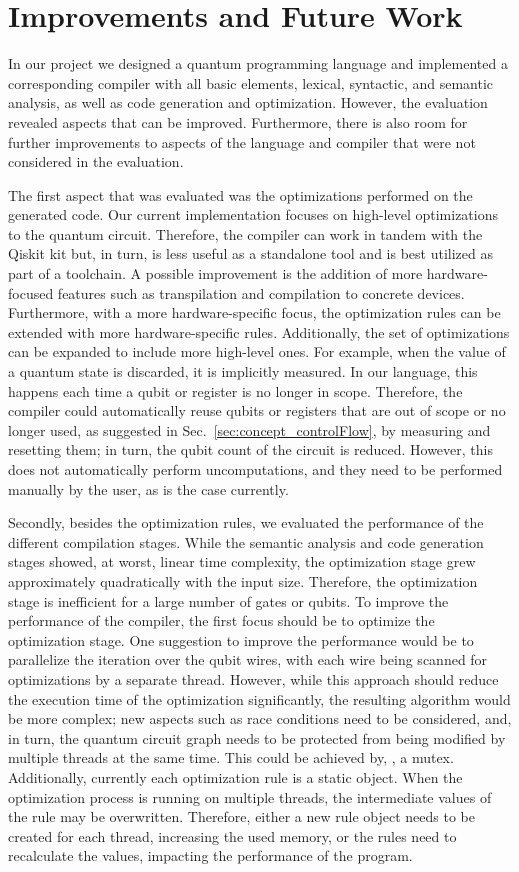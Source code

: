 \section{Improvements and Future Work}
In our project we designed a quantum programming language and implemented a corresponding compiler with all basic elements, lexical, syntactic, and semantic analysis, as well as code generation and optimization. However, the evaluation revealed aspects that can be improved. Furthermore, there is also room for further improvements to aspects of the language and compiler that were not considered in the evaluation.

The first aspect that was evaluated was the optimizations performed on the generated code. Our current implementation focuses on high-level optimizations to the quantum circuit. Therefore, the compiler can work in tandem with the Qiskit kit but, in turn, is less useful as a standalone tool and is best utilized as part of a toolchain. A possible improvement is the addition of more hardware-focused features such as transpilation and compilation to concrete devices. Furthermore, with a more hardware-specific focus, the optimization rules can be extended with more hardware-specific rules.
Additionally, the set of optimizations can be expanded to include more high-level ones. For example, when the value of a quantum state is discarded, it is implicitly measured. In our language, this happens each time a qubit or register is no longer in scope. 
Therefore, the compiler could automatically reuse qubits or registers that are out of scope or no longer used, as suggested in Sec.~\ref{sec:concept_controlFlow}, by measuring and resetting them; in turn, the qubit count of the circuit is reduced. However, this does not automatically perform uncomputations, and they need to be performed manually by the user, as is the case currently.

Secondly, besides the optimization rules, we evaluated the performance of the different compilation stages. While the semantic analysis and code generation stages showed, at worst, linear time complexity, the optimization stage grew approximately quadratically with the input size. Therefore, the optimization stage is inefficient for a large number of gates or qubits. To improve the performance of the compiler, the first focus should be to optimize the optimization stage. One suggestion to improve the performance would be to parallelize the iteration over the qubit wires, with each wire being scanned for optimizations by a separate thread. However, while this approach should reduce the execution time of the optimization significantly, the resulting algorithm would be more complex; new aspects such as race conditions need to be considered, and, in turn, the quantum circuit graph needs to be protected from being modified by multiple threads at the same time. This could be achieved by, \eg, a mutex. Additionally, currently each optimization rule is a static object. When the optimization process is running on multiple threads, the intermediate values of the rule may be overwritten. Therefore, either a new rule object needs to be created for each thread, increasing the used memory, or the rules need to recalculate the values, impacting the performance of the program.

